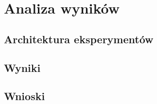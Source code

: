 \chapter{Analiza wyników}

\section{Architektura eksperymentów}

\section{Wyniki}

\section{Wnioski}
